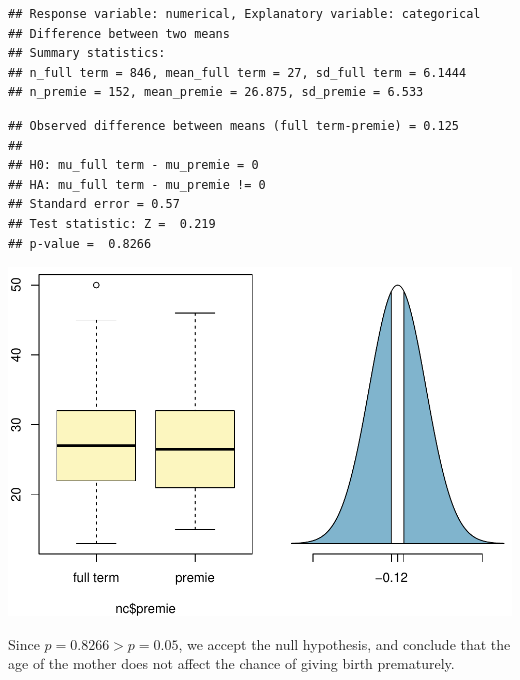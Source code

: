 \documentclass[]{article}
\begin{document}
\begin{verbatim}
## Response variable: numerical, Explanatory variable: categorical
## Difference between two means
## Summary statistics:
## n_full term = 846, mean_full term = 27, sd_full term = 6.1444
## n_premie = 152, mean_premie = 26.875, sd_premie = 6.533
\end{verbatim}

\begin{verbatim}
## Observed difference between means (full term-premie) = 0.125
## 
## H0: mu_full term - mu_premie = 0 
## HA: mu_full term - mu_premie != 0 
## Standard error = 0.57 
## Test statistic: Z =  0.219 
## p-value =  0.8266
\end{verbatim}

\includegraphics{DATA_606_Lab_5_files/figure-latex/unnamed-chunk-10-1.pdf}

Since \(p = 0.8266 > p = 0.05\), we accept the null hypothesis, and
conclude that the age of the mother does not affect the chance of giving
birth prematurely.
\end{document}
